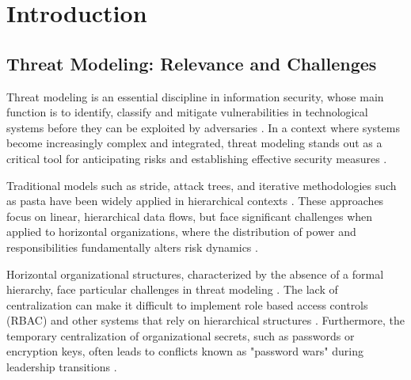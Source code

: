 
%

%

\chapter{Introduction}
\label{cha:introduction}

\section{Threat Modeling: Relevance and Challenges}
\label{sec:threat_modeling_relevance_challenges}

Threat modeling is an essential discipline in information security, whose main
function is to identify, classify and mitigate vulnerabilities in technological
systems before they can be exploited by adversaries
\cite{ThreatModelingdesigningForSecurity,
ThreatModelingASystematicLiteratureReview}. In a context where systems become
increasingly complex and integrated, threat modeling stands out as a critical
tool for anticipating risks and establishing effective security measures
\cite{DemystifyingTheThreatModelingProcess,
ThreatModelingASummaryOfAvailableMethods}.

Traditional models such as \gls{stride}, attack trees, and iterative
methodologies such as \gls{pasta} have been widely applied in hierarchical contexts
\cite{MicrosoftThreatModelingTechnique, AttackTrees, RiskCentricThreatModeling}.
These approaches focus on linear, hierarchical data flows, but face
significant challenges when applied to horizontal organizations, where the
distribution of power and responsibilities fundamentally alters risk dynamics
\cite{EvaluationofCompetingThreatModeling, Colbac}.

Horizontal organizational structures, characterized by the absence of a formal
hierarchy, face particular challenges in threat modeling \cite{Colbac}. The lack of
centralization can make it difficult to implement role based access controls
(RBAC) and other systems that rely on hierarchical structures \cite{Colbac}. Furthermore, the
temporary centralization of organizational secrets, such as passwords or
encryption keys, often leads to conflicts known as "password wars" during
leadership transitions \cite{FromCounterpublicstoContentious}.

